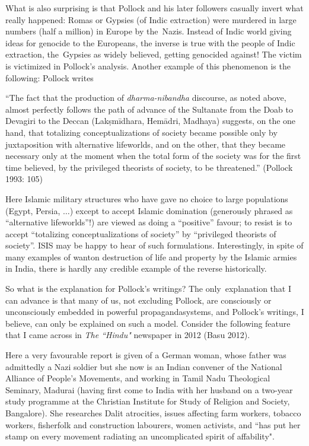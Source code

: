 What is also surprising is that Pollock and his later followers casually invert what really happened: Romas or Gypsies (of Indic extraction) were murdered in large numbers (half a million) in Europe by the~Nazis. Instead of Indic world giving ideas for genocide to the Europeans, the inverse is true with the people of Indic extraction, the~Gypsies as widely believed, getting genocided against! The victim is victimized in Pollock's analysis. Another example of this phenomenon is the following: Pollock writes

\begin{myquote}
“The fact that the production of {\sl dharma-nibandha} discourse, as noted above, almost perfectly follows the path of advance of the Sultanate from the Doab to Devagiri to the Deccan (Lakṣmīdhara, Hemādri, Madhaya) suggests, on the one hand, that totalizing conceptualizations of society became possible only by juxtaposition with alternative lifeworlds, and on the other, that they became necessary only at the moment when the total form of the society was for the first time believed, by the privileged theorists of society, to be threatened.” 
\hfill(Pollock 1993: 105)
\end{myquote}

Here Islamic military structures who have gave no choice to large populations (Egypt, Persia, $\ldots$) except to accept Islamic domination (generously phrased as “alternative lifeworlds”!) are viewed as doing a “positive” favour; to resist is to accept “totalizing conceptualizations of society” by “privileged theorists of society”. ISIS may be happy to hear of such formulations. Interestingly, in spite of many examples of wanton destruction of life and property by the Islamic armies in India, there is hardly any credible example of the reverse historically. 

So what is the explanation for Pollock's writings? The only~explanation that I can advance is that many of us, not excluding Pollock, are consciously or unconsciously embedded in powerful propaganda\break systems, and Pollock’s writings, I believe, can only be explained on such a model.  Consider the following feature that I came across in {\sl The ``Hindu"} newspaper in 2012 (Basu 2012).

Here a very favourable report is given of a German woman, whose father was admittedly a Nazi soldier but she now is an Indian convener of the National Alliance of People's Movements, and working in Tamil Nadu Theological Seminary, Madurai (having first come to India with her husband on a two-year study programme at the Christian Institute for Study of Religion and Society, Bangalore). She researches Dalit atrocities, issues affecting farm workers, tobacco workers, fisherfolk and construction labourers, women activists, and ``has put her stamp on every movement radiating an uncomplicated spirit of affability".

